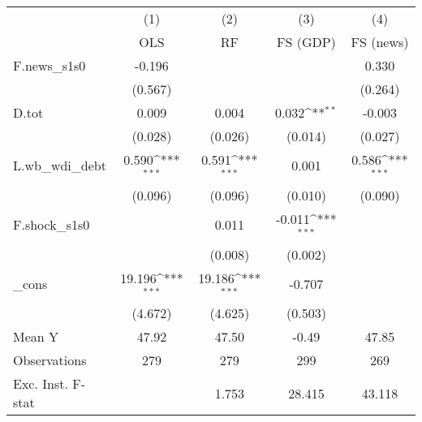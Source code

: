{
\def\sym#1{\ifmmode^{#1}\else\(^{#1}\)\fi}
\begin{tabular}{l*{4}{c}}
\toprule
            &\multicolumn{1}{c}{(1)}&\multicolumn{1}{c}{(2)}&\multicolumn{1}{c}{(3)}&\multicolumn{1}{c}{(4)}\\
            &\multicolumn{1}{c}{OLS}&\multicolumn{1}{c}{RF}&\multicolumn{1}{c}{FS (GDP)}&\multicolumn{1}{c}{FS (news)}\\
\midrule
F.news\_s1s0 &      -0.196         &                     &                     &       0.330         \\
            &     (0.567)         &                     &                     &     (0.264)         \\
\addlinespace
D.tot       &       0.009         &       0.004         &       0.032\sym{**} &      -0.003         \\
            &     (0.028)         &     (0.026)         &     (0.014)         &     (0.027)         \\
\addlinespace
L.wb\_wdi\_debt&       0.590\sym{***}&       0.591\sym{***}&       0.001         &       0.586\sym{***}\\
            &     (0.096)         &     (0.096)         &     (0.010)         &     (0.090)         \\
\addlinespace
F.shock\_s1s0&                     &       0.011         &      -0.011\sym{***}&                     \\
            &                     &     (0.008)         &     (0.002)         &                     \\
\addlinespace
\_cons      &      19.196\sym{***}&      19.186\sym{***}&      -0.707         &                     \\
            &     (4.672)         &     (4.625)         &     (0.503)         &                     \\
\midrule
Mean Y      &       47.92         &       47.50         &       -0.49         &       47.85         \\
Observations&         279         &         279         &         299         &         269         \\
Exc. Inst. F-stat&                     &       1.753         &      28.415         &      43.118         \\
\bottomrule
\end{tabular}
}
